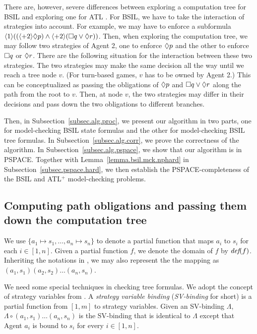 There are, however, severe differences between exploring 
a computation tree for 
BSIL and exploring one for ATL \cite{AHK02}.   
For BSIL, we have to take the interaction of strategies into account.  
For example, we may have to enforce a subformula 
$\langle 1\rangle((\langle+ 2\rangle \Diamond p)
\wedge\langle+ 2\rangle (\Box q\vee \Diamond r))$.  
Then, when exploring the computation tree, 
we may follow two strategies of Agent 2, one to enforce $\Diamond p$ and 
the other to enforce $\Box q$ or $\Diamond r$.  
There are the following situation for the 
interaction between these two strategies. 
The two strategies may make the same decision all the way 
until we reach a tree node $v$.  
(For turn-based games, $v$ has to be owned by Agent 2.)    
This can be conceptualized as passing the obligations of $\Diamond p$ and 
$\Box q\vee\Diamond r$ along the path from the root to $v$.  
Then, at node $v$, the two strategies may differ in their decisions 
and pass down the two obligations to different branches. 

\label{reply2.exp.alg3} 
Then, in Subsection~\ref{subsec.alg.proc},
we present our algorithm in two parts,
one for model-checking BSIL state formulas
and the other for model-checking BSIL tree formulas.
In Subsection~\ref{subsec.alg.corr},
we prove the correctness of the algorithm.
In Subsection~\ref{subsec.alg.pspace}, 
we show that our algorithm is in PSPACE.  
Together with Lemma~\ref{lemma.bsil.mck.nphard} in 
Subsection~\ref{subsec.pspace.hard}, 
we then establish the PSPACE-completeness of 
the BSIL and ATL$^+$ model-checking problems.  



\subsection{Computing path obligations and passing them down the computation tree
\label{subsec.children.ltl.ob}
}

We use $\{a_1 \mapsto s_1,\ldots,a_n\mapsto s_n\}$ to denote 
a partial function that maps $a_i$ to $s_i$ for each $i\in[1,n]$.  
Given a partial function $f$, 
we denote the domain of $f$ by $\textit{def}(f)$.
Inheriting the notations in \cite{MMV10}, 
we may also represent the the mapping as $(a_1,s_1)(a_2,s_2)\ldots(a_n,s_n)$.  

We need some special techniques in checking tree formulas.  
We adopt the concept of strategy variables from \cite{CHP10,MMV10}. 
A {\em strategy variable binding} ({\em SV-binding} for short) 
is a partial function from $[1,m]$ to strategy variables.  
Given an SV-binding $\Lambda$, 
$\Lambda\circ(a_1, s_1)\ldots(a_n, s_n)$ 
is the SV-binding that is identical to $\Lambda$ 
except that Agent $a_i$ is bound to $s_i$ for every $i\in[1,n]$.  

